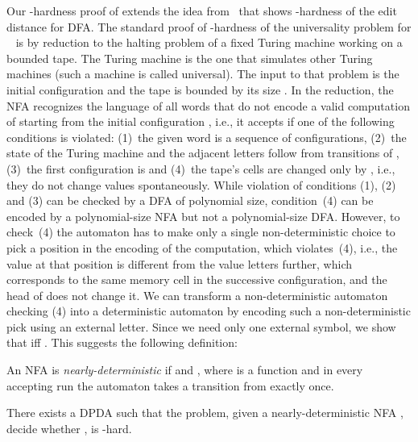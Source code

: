 \documentclass{CSML}
\begin{document}
Our -hardness proof of  extends the idea from~\cite{riveros} that shows -hardness of the edit distance for
DFA. The standard proof of -hardness of the universality problem
for ~\cite{HU79} is by reduction to the halting problem of a fixed Turing machine  working on a bounded tape. The Turing machine  is the one that simulates other Turing machines (such a machine is called universal). 
The input to that problem is the initial configuration  and the tape is bounded by its size .  
In the reduction, the NFA recognizes the language of all words that do not encode a valid computation of  starting from the initial configuration , i.e., 
it accepts if one of the following conditions is violated: 
(1)~the given word is a sequence of configurations,
(2)~the state of the Turing machine and the adjacent letters follow from transitions of , 
(3)~the first configuration is 
and (4)~the tape's cells are changed only by , i.e., they do not change values spontaneously.
While violation of conditions (1), (2) and (3) can be checked by a DFA of polynomial size, condition~(4)
can be encoded by a polynomial-size NFA but not a polynomial-size DFA. However, to check~(4)
the automaton has to make only a single non-deterministic choice to pick a position in the encoding of the computation, 
which violates~(4), i.e., the value at that position is different from the value  letters further, which
corresponds to the same memory cell in the successive configuration, and the head
of  does not change it. We can transform a non-deterministic automaton  checking (4) into 
a deterministic automaton  by encoding such a non-deterministic pick using an external letter.
Since we need only one external symbol, we show that  iff
. This suggests the following definition:

\begin{defi}
An NFA  is \emph{nearly-deterministic} if 
 and , where  is a function and in
every accepting run the automaton takes a transition from  exactly once.
\end{defi}

\begin{lem}
There exists a DPDA  such that the problem, given a nearly-deterministic NFA , decide
whether , is -hard.
\label{l:ExpTimeHardness}
\end{lem}
\end{document}
